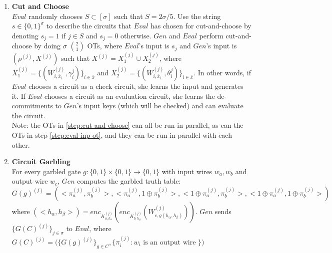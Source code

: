 \documentclass{article}
\begin{document}
\begin{enumerate}
	\item \label{step:cut-and-choose} \textbf{Cut and Choose}\\
	$Eval$ randomly chooses $S \subset [\sigma]$ such that $S = 2\sigma / 5$. Use the string $s \in \{0,1\}^{\sigma}$ to describe the circuits that $Eval$ has chosen for cut-and-choose by denoting $s_{j} = 1$ if $j \in S$ and $s_{j} = 0$ otherwise.  $Gen$ and $Eval$ perform cut-and-choose by doing $\sigma$ ${2 \choose 1}$ OTs, where $Eval$'s input is $s_{j}$ and $Gen$'s input is $(\rho^{(j)}, X^{(j)})$ such that $X^{(j)} = X_{1}^{(j)} \cup X_{2}^{(j)}$, where $X_{1}^{(j)} = \{(W_{i,\overline{x}_{i}}^{(j)},\gamma_{i}^{j})\}_{i \in \overline{x}}$ and $X_{2}^{(j)} = \{(W_{i,\overline{x}_{i}}^{(j)},\theta_{i}^{j})\}_{i \in \overline{x}}$. In other words, if $Eval$ chooses a circuit as a check circuit, she learns the input and generates it. If $Eval$ chooses a circuit as an evaluation circuit, she learns the de-commitments to $Gen$'s input keys (which will be checked) and can evaluate the circuit. \\
	Note: the OTs in \ref{step:cut-and-choose} can all be run in parallel, as can the OTs in step \ref{step:eval-inp-ot}, and they can be run in parallel with each other. 
	
	\item \label{step:circuit-garbling} \textbf{Circuit Garbling}\\
	For every garbled gate $g: \{0,1\} \times \{0,1\} \rightarrow \{0,1\}$ with input wires $w_{a}, w_{b}$ and output wire $w_{c}$, $Gen$ computes the garbled truth table:
	$$G(g)^{(j)} = ( <\pi_{a}^{(j)}, \pi_{b}^{(j)}>,<\pi_{a}^{(j)}, 1 \oplus \pi_{b}^{(j)}>, < 1 \oplus \pi_{a}^{(j)}, \pi_{b}^{(j)}>,<1 \oplus  \pi_{a}^{(j)}, 1 \oplus \pi_{b}^{(j)}>)$$
	where $(<h_{\alpha},h_{\beta}>) = enc_{K_{a,h_{\alpha}}^{(j)}}(   enc_{K_{b,h_{\beta}}^{(j)}} ( W_{c,g(h_{\alpha},h_{\beta})}^{(j)} ))$.
	$Gen$ sends $\{ G(C)^{(j)} \}_{j \in \sigma}$ to $Eval$, where $G(C)^{(j)} = \big( \{G(g)^{(j)}\}_{g \in C}, \{ \pi_{i}^{(j)}: w_{i} \text{ is an output wire } \}  \big)$
	

\end{enumerate}
\end{document}
